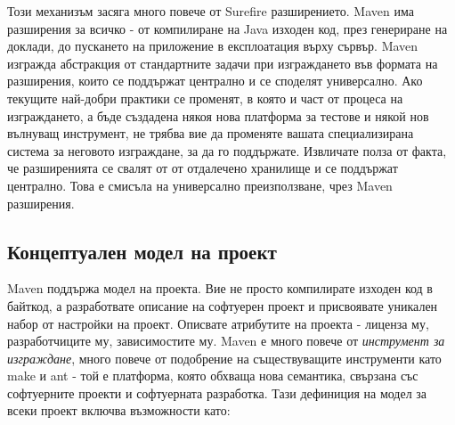 Този механизъм засяга много повече от Surefire разширението. Maven има
разширения за всичко - от компилиране на Java изходен код, през
генериране на доклади, до пускането на приложение в експлоатация върху
сървър. Maven изгражда абстракция от стандартните задачи при
изграждането във формата на разширения, които се поддържат централно и
се споделят универсално. Ако текущите най-добри практики се променят,
в която и част от процеса на изграждането, а бъде създадена някоя нова
платформа за тестове и някой нов вълнуващ инструмент, не трябва вие да
променяте вашата специализирана система за неговото изграждане, за да
го поддържате. Извличате полза от факта, че разширенията се свалят от
от отдалечено хранилище и се поддържат централно. Това е смисъла на
универсално преизползване, чрез Maven разширения.   
\subsection{Концептуален модел на проект}
Maven поддържа модел на проекта. Вие не просто компилирате изходен код
в байткод, а разработвате описание на софтуерен проект и присвоявате
уникален набор от настройки на проект. Описвате атрибутите на проекта
- лиценза му, разработчиците му, зависимостите му. Maven е много
повече от \emph{инструмент за изграждане}, много повече от подобрение
на съществуващите инструменти като make и ant - той е платформа, която
обхваща нова семантика, свързана със софтуерните проекти и софтуерната
разработка. Тази дефиниция на модел за всеки проект включва
възможности като:
